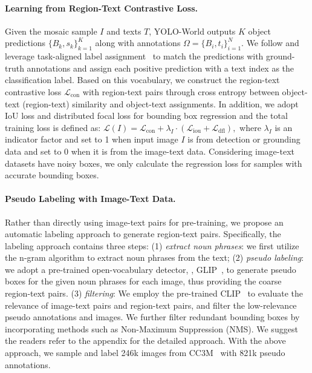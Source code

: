 \documentclass[10pt,twocolumn,letterpaper]{article}
\newcommand{\name}{YOLO-World}
\begin{document}
\paragraph{Learning from Region-Text Contrastive Loss.}
Given the mosaic sample $I$ and texts $T$, \name{} outputs $K$ object predictions $\{B_k, s_k\}_{k=1}^K$ along with annotations $\Omega=\{B_i,t_i\}^N_{i=1}$.
We follow \cite{yolov8_ultralytics} and leverage task-aligned label assignment~\cite{TOOD} to match the predictions with ground-truth annotations and assign each positive prediction with a text index as the classification label. 
Based on this vocabulary, we construct the region-text contrastive loss $\mathcal{L}_{\text{con}}$ with region-text pairs through cross entropy between object-text (region-text) similarity and object-text assignments.
In addition, we adopt IoU loss and distributed focal loss for bounding box regression and the total training loss is defined as: $    \mathcal{L}(I) = \mathcal{L}_{\text{con}} + \lambda_I\cdot(\mathcal{L}_{\text{iou}} + \mathcal{L}_{\text{dfl}}),$
where $\lambda_I$ is an indicator factor and set to 1 when input image $I$ is from detection or grounding data and set to 0 when it is from the image-text data.
Considering image-text datasets have noisy boxes, we only calculate the regression loss for samples with accurate bounding boxes.

\paragraph{Pseudo Labeling with Image-Text Data.}
\label{sec:pseudo_labeling}
Rather than directly using image-text pairs for pre-training, we propose an automatic labeling approach to generate region-text pairs.
Specifically, the labeling approach contains three steps: 
(1) \textit{extract noun phrases}: we first utilize the n-gram algorithm to extract noun phrases from the text; 
(2) \textit{pseudo labeling}: we adopt a pre-trained open-vocabulary detector, \eg, GLIP~\cite{GLIP}, to generate pseudo boxes for the given noun phrases for each image, thus providing the coarse region-text pairs.
(3) \textit{filtering}: We employ the pre-trained CLIP~\cite{CLIP} to evaluate the relevance of image-text pairs and region-text pairs, and filter the low-relevance pseudo annotations and images. We further filter redundant bounding boxes by incorporating methods such as Non-Maximum Suppression (NMS).
We suggest the readers refer to the appendix for the detailed approach.
With the above approach, we sample and label 246k images from CC3M~\cite{CC3M} with 821k pseudo annotations.
\end{document}
